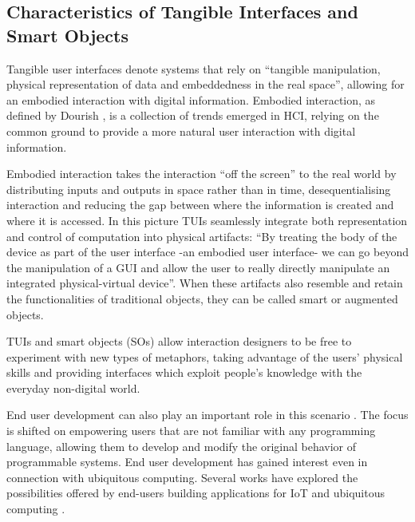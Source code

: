 \subsection{Characteristics of Tangible Interfaces and Smart Objects}
Tangible user interfaces denote systems that rely on ``tangible manipulation, physical representation of data and embeddedness in the real space'', allowing for an embodied interaction with digital information. Embodied interaction, as defined by Dourish \cite{dourish_where_2004}, is a collection of trends emerged in HCI, relying on the common ground to provide a more natural user interaction with digital information.

Embodied interaction takes the interaction ``off the screen'' to the real world by distributing inputs and outputs in space rather than in time, desequentialising interaction and reducing the gap between where the information is created and where it is accessed. In this picture TUIs seamlessly integrate both representation and control of computation into physical artifacts: ``By treating the body of the device as part of the user interface -an embodied user interface- we can go beyond the manipulation of a GUI and allow the user to really directly manipulate an integrated physical-virtual device''.
When these artifacts also resemble and retain the functionalities of traditional objects, they can be called smart or augmented objects.

TUIs and smart objects (SOs) allow interaction designers to be free to experiment with new types of metaphors, taking advantage of the users' physical skills and providing interfaces which exploit people's knowledge with the everyday non-digital world.

End user development can also play an important role in this scenario \cite{lieberman_end-user_2006}. The focus is shifted on empowering users that are not familiar with any programming language, allowing them to develop and modify the original behavior of programmable systems.
End user development has gained interest even in connection with ubiquitous computing. Several works have explored the possibilities offered by end-users building applications for IoT and ubiquitous computing \cite{barricelli_designing_2015} \cite{bellucci_extreme_2015}.

